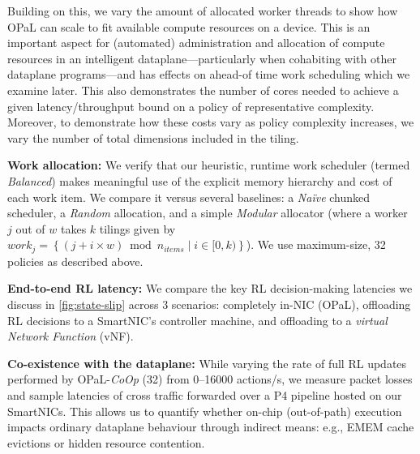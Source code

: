 \documentclass[
sigconf,natbib=false
]{acmart}
\newcommand{\fakepara}[1]{\noindent\textbf{#1:}}
\newcommand{\approachshort}{OPaL}
\newcommand{\Coopfw}{\emph{CoOp}}
\begin{document}
Building on this, we vary the amount of allocated worker threads to show how \approachshort{} can scale to fit available compute resources on a device.
This is an important aspect for (automated) administration and allocation of compute resources in an intelligent dataplane---particularly when cohabiting with other dataplane programs---and has effects on ahead-of time work scheduling which we examine later.
This also demonstrates the number of cores needed to achieve a given latency/throughput bound on a policy of representative complexity.
Moreover, to demonstrate how these costs vary as policy complexity increases, we vary the number of total dimensions included in the tiling.

\fakepara{Work allocation}
We verify that our heuristic, runtime work scheduler (termed \emph{Balanced}) makes meaningful use of the explicit memory hierarchy and cost of each work item.
We compare it versus several baselines: a \emph{Na\"{i}ve} chunked scheduler, a \emph{Random} allocation, and a simple \emph{Modular} allocator (where a worker $j$ out of $w$ takes $k$ tilings given by $\mathit{work}_j=\left\{\left(j + i \times w\right) \bmod n_{\mathit{items}} \mid i \in [0,k) \right\}$).
We use maximum-size, \SI{32}{\bit} policies as described above.

\fakepara{End-to-end RL latency}
We compare the key RL decision-making latencies we discuss in \cref{fig:state-slip} across 3 scenarios: completely in-NIC (\approachshort{}), offloading RL decisions to a SmartNIC's controller machine, and offloading to a \emph{virtual Network Function} (vNF).

\fakepara{Co-existence with the dataplane}
While varying the rate of full RL updates performed by \approachshort{}-\Coopfw{} (\SI{32}{\bit}) from \numrange{0}{16000} actions/s, we measure packet losses and sample latencies of cross traffic forwarded over a P4 pipeline hosted on our SmartNICs.
This allows us to quantify whether on-chip (out-of-path) execution impacts ordinary dataplane behaviour through indirect means: e.g., EMEM cache evictions or hidden resource contention.
\end{document}
